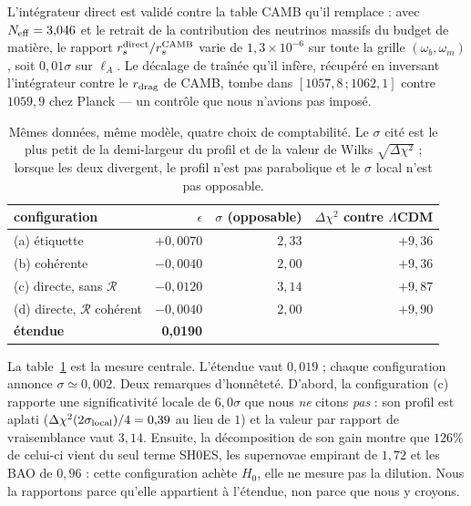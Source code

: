 \documentclass[11pt,a4paper]{article}
\begin{document}
L'intégrateur direct est validé contre la table CAMB qu'il remplace : avec
$N_{\rm eff}=3{,}046$ et le retrait de la contribution des neutrinos massifs du budget de
matière, le rapport $r_s^{\rm direct}/r_s^{\rm CAMB}$ varie de $1{,}3\times10^{-6}$ sur toute
la grille $(\omega_b,\omega_m)$, soit $0{,}01\sigma$ sur $\ell_A$. Le décalage de traînée
qu'il infère, récupéré en inversant l'intégrateur contre le $r_{\rm drag}$ de CAMB, tombe dans
$[1057{,}8\,;1062{,}1]$ contre $1059{,}9$ chez Planck --- un contrôle que nous n'avions pas
imposé.

\begin{table}[t]
\centering
\begin{tabular}{lrrr}
\toprule
configuration & $\epsilon$ & $\sigma$ (opposable) & $\Delta\chi^2$ contre $\Lambda$CDM \\
\midrule
(a) étiquette                 & $+0{,}0070$ & $2{,}33$ & $+9{,}36$ \\
(b) cohérente                 & $-0{,}0040$ & $2{,}00$ & $+9{,}36$ \\
(c) directe, sans $\mathcal{R}$ & $-0{,}0120$ & $3{,}14$ & $+9{,}87$ \\
(d) directe, $\mathcal{R}$ cohérent & $-0{,}0040$ & $2{,}00$ & $+9{,}90$ \\
\midrule
\textbf{étendue} & \textbf{0{,}0190} & & \\
\bottomrule
\end{tabular}
\caption{Mêmes données, même modèle, quatre choix de comptabilité. Le $\sigma$ cité est le
plus petit de la demi-largeur du profil et de la valeur de Wilks $\sqrt{\Delta\chi^2}$ ;
lorsque les deux divergent, le profil n'est pas parabolique et le $\sigma$ local n'est pas
opposable.}
\label{tab:quatre}
\end{table}

La table~\ref{tab:quatre} est la mesure centrale. L'étendue vaut $0{,}019$ ; chaque
configuration annonce $\sigma\simeq0{,}002$. Deux remarques d'honnêteté. D'abord, la
configuration (c) rapporte une significativité locale de $6{,}0\sigma$ que nous \emph{ne}
citons \emph{pas} : son profil est aplati ($\Delta\chi^2(2\sigma_{\rm local})/4 = 0{,}39$ au
lieu de $1$) et la valeur par rapport de vraisemblance vaut $3{,}14$. Ensuite, la
décomposition de son gain montre que $126\%$ de celui-ci vient du seul terme SH0ES, les
supernovae empirant de $1{,}72$ et les BAO de $0{,}96$ : cette configuration achète $H_0$,
elle ne mesure pas la dilution. Nous la rapportons parce qu'elle appartient à l'étendue, non
parce que nous y croyons.
\end{document}
